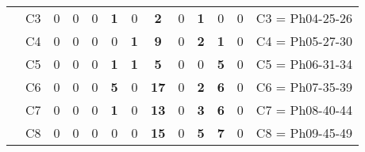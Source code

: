 \begin{table}[H]
{\begin{tabular}{|ccrrrrrrrrrrc|}
\multicolumn{1}{|c|}{}                                      & \multicolumn{1}{c|}{C3} & \multicolumn{1}{c|}{0}  & \multicolumn{1}{c|}{0}  & \multicolumn{1}{c|}{0}  & \multicolumn{1}{c|}{\textbf{1}}  & \multicolumn{1}{c|}{0}  & \multicolumn{1}{c|}{\textbf{2}}  & \multicolumn{1}{c|}{0}  & \multicolumn{1}{c|}{\textbf{1}}  & \multicolumn{1}{c|}{0}  & \multicolumn{1}{c|}{0}  & C3 = Ph04-25-26   \\ \cline{2-13}
\multicolumn{1}{|c|}{}                                      & \multicolumn{1}{c|}{C4} & \multicolumn{1}{c|}{0}  & \multicolumn{1}{c|}{0}  & \multicolumn{1}{c|}{0}  & \multicolumn{1}{c|}{0}  & \multicolumn{1}{c|}{\textbf{1}}  & \multicolumn{1}{c|}{\textbf{9}}  & \multicolumn{1}{c|}{0}  & \multicolumn{1}{c|}{\textbf{2}}  & \multicolumn{1}{c|}{\textbf{1}}  & \multicolumn{1}{c|}{0}  & C4 = Ph05-27-30   \\ \cline{2-13}
\multicolumn{1}{|c|}{}                                      & \multicolumn{1}{c|}{C5} & \multicolumn{1}{c|}{0}  & \multicolumn{1}{c|}{0}  & \multicolumn{1}{c|}{0}  & \multicolumn{1}{c|}{\textbf{1}}  & \multicolumn{1}{c|}{\textbf{1}}  & \multicolumn{1}{c|}{\textbf{5}}  & \multicolumn{1}{c|}{0}  & \multicolumn{1}{c|}{0}  & \multicolumn{1}{c|}{\textbf{5}}  & \multicolumn{1}{c|}{0}  & C5 = Ph06-31-34   \\ \cline{2-13}
\multicolumn{1}{|c|}{}                                      & \multicolumn{1}{c|}{C6} & \multicolumn{1}{c|}{0}  & \multicolumn{1}{c|}{0}  & \multicolumn{1}{c|}{0}  & \multicolumn{1}{c|}{\textbf{5}}  & \multicolumn{1}{c|}{0}  & \multicolumn{1}{c|}{\textbf{17}} & \multicolumn{1}{c|}{0}  & \multicolumn{1}{c|}{\textbf{2}}  & \multicolumn{1}{c|}{\textbf{6}}  & \multicolumn{1}{c|}{0}  & C6 = Ph07-35-39   \\ \cline{2-13}
\multicolumn{1}{|c|}{}                                      & \multicolumn{1}{c|}{C7} & \multicolumn{1}{c|}{0}  & \multicolumn{1}{c|}{0}  & \multicolumn{1}{c|}{0}  & \multicolumn{1}{c|}{\textbf{1}}  & \multicolumn{1}{c|}{0}  & \multicolumn{1}{c|}{\textbf{13}} & \multicolumn{1}{c|}{0}  & \multicolumn{1}{c|}{\textbf{3}}  & \multicolumn{1}{c|}{\textbf{6}}  & \multicolumn{1}{c|}{0}  & C7 = Ph08-40-44   \\ \cline{2-13}
\multicolumn{1}{|c|}{}                                      & \multicolumn{1}{c|}{C8} & \multicolumn{1}{c|}{0}  & \multicolumn{1}{c|}{0}  & \multicolumn{1}{c|}{0}  & \multicolumn{1}{c|}{0}  & \multicolumn{1}{c|}{0}  & \multicolumn{1}{c|}{\textbf{15}} & \multicolumn{1}{c|}{0}  & \multicolumn{1}{c|}{\textbf{5}}  & \multicolumn{1}{c|}{\textbf{7}}  & \multicolumn{1}{c|}{0}  & C8 = Ph09-45-49   \\ \cline{2-13}

\end{tabular}}
\end{table}
